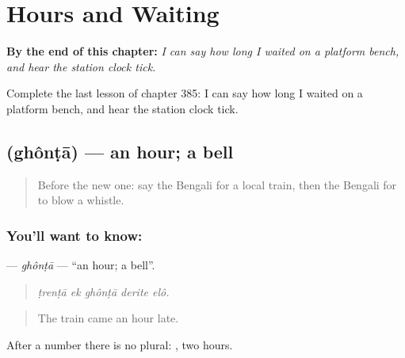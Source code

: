 
\chapter{Hours and Waiting}
\label{ch:bn-hours-and-waiting}

\begin{chapteropening}
\textbf{By the end of this chapter:} \emph{I can say how long I waited on a platform bench, and hear the station clock tick.}

Complete the last lesson of chapter 385: I can say how long I waited on a platform bench, and hear the station clock tick.
\end{chapteropening}

\section[\texorpdfstring{\bn{ঘণ্টা} (ghônṭā)}{ঘণ্টা (ghônṭā)}]{ (ghônṭā) — an hour; a bell}

\label{lesson:BN-C385-ghonta}



\begin{quote}
Before the new one: say the Bengali for a local train, then the Bengali for to blow a whistle.
\end{quote}

\subsection*{You'll want to know: }
\textbf{} — \emph{ghônṭā} — \textquotedblleft{}an hour; a bell\textquotedblright{}.

\begin{quote}
    
\end{quote}

\begin{quote}
\emph{ṭrenṭā ek ghônṭā derite elô.}
\end{quote}

\begin{quote}
The train came an hour late.
\end{quote}

After a number there is no plural:  , two hours.


